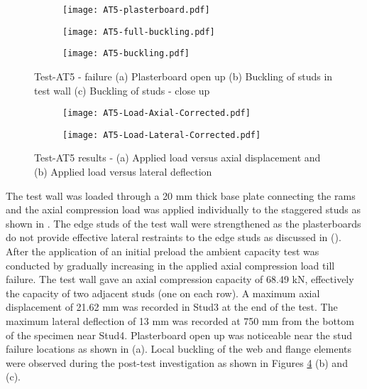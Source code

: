 \begin{figure}[!htbp]
	\centering
	\begin{subfigure}[b]{0.4\textwidth}
		\centering
		\texttt{[image: AT5-plasterboard.pdf]}
		\caption{}
		\label{subfig:AT5-full-buckling}
	\end{subfigure}
	\begin{subfigure}[b]{0.5\textwidth}
		\centering
		\texttt{[image: AT5-full-buckling.pdf]}
		\caption{}
		\label{subfig:AT5-plasterboard}
	\end{subfigure}
	\begin{subfigure}[b]{0.45\textwidth}
		\centering
		\texttt{[image: AT5-buckling.pdf]}
		\caption{}
		\label{subfig:AT5-buckling}
	\end{subfigure}
	   \caption{Test-AT5 - failure (a) Plasterboard open up  (b) Buckling of studs in test wall (c) Buckling of studs - close up }
	   \label{fig:AT5-failure}
\end{figure}
\begin{figure}[!htbp]
	\centering
	\begin{subfigure}[b]{0.7\textwidth}
		\centering
		\texttt{[image: AT5-Load-Axial-Corrected.pdf]}
		\caption{}
		\label{subfig:AT5-Load-Axial-Corrected}
	\end{subfigure}
	\begin{subfigure}[b]{0.7\textwidth}
		\centering
		\texttt{[image: AT5-Load-Lateral-Corrected.pdf]}
		\caption{}
		\label{subfig:AT5-Load-Lateral-Corrected}
	\end{subfigure}
	   \caption{Test-AT5 results - (a) Applied load versus axial displacement and (b) Applied load versus lateral deflection}
	   \label{fig:AT5-results}
\end{figure}

The test wall was loaded through a 20 mm thick base plate connecting the rams and the axial compression load was applied individually to the staggered studs as shown in . The edge studs of the test wall were strengthened as the plasterboards do not provide effective lateral restraints to the edge studs as discussed in  (). After the application of an initial preload the ambient capacity test was conducted by gradually increasing in the applied axial compression load till failure. The test wall gave an axial compression capacity of 68.49 kN, effectively the capacity of two adjacent studs (one on each row). A maximum axial displacement of 21.62 mm was recorded in Stud3 at the end of the test. The maximum lateral deflection of 13 mm was recorded at 750 mm from the bottom of the specimen near Stud4. Plasterboard open up was noticeable near the stud failure locations as shown in  (a). Local buckling of the web and flange elements were observed during the post-test investigation as shown in Figures \ref{fig:AT5-failure} (b) and (c).

